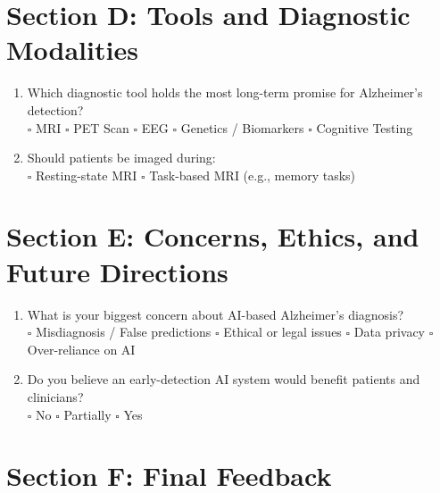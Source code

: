\section*{Section D: Tools and Diagnostic Modalities}

\begin{enumerate}[resume]
\item Which diagnostic tool holds the most long-term promise for Alzheimer’s detection?\\
$\square$ MRI \hspace{0.3cm}
$\square$ PET Scan \hspace{0.3cm}
$\square$ EEG \hspace{0.3cm}
$\square$ Genetics / Biomarkers \hspace{0.3cm}
$\square$ Cognitive Testing

\item Should patients be imaged during:\\
$\square$ Resting-state MRI \hspace{0.3cm}
$\square$ Task-based MRI (e.g., memory tasks)

\underline{\hspace{10cm}}
\end{enumerate}


\section*{Section E: Concerns, Ethics, and Future Directions}

\begin{enumerate}[resume]
\item What is your biggest concern about AI-based Alzheimer’s diagnosis?\\
$\square$ Misdiagnosis / False predictions \hspace{0.3cm}
$\square$ Ethical or legal issues \hspace{0.3cm}
$\square$ Data privacy \hspace{0.3cm}
$\square$ Over-reliance on AI

\item Do you believe an early-detection AI system would benefit patients and clinicians?\\
$\square$ No \hspace{0.3cm}
$\square$ Partially \hspace{0.3cm}
$\square$ Yes
\end{enumerate}

\section*{Section F: Final Feedback}

